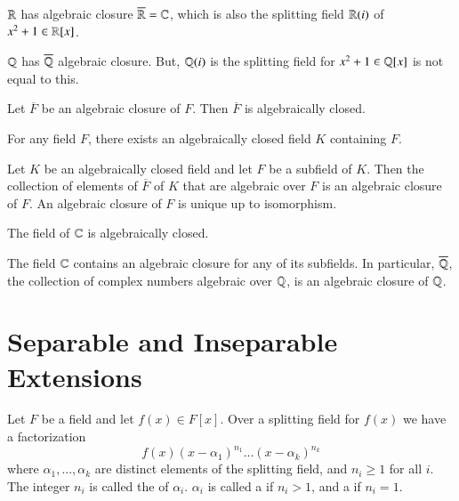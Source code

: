 \documentclass[12pt, a4paper, oneside, openright, titlepage]{book}
\begin{document}
\begin{eg}
    $\mathbb R$ has algebraic closure $\overline{\mathbb R} = \mathbb C$, which is also the splitting field $\mathbb R(i)$ of $x^2+1 \in \mathbb R[x]$.
\end{eg}

\begin{eg}
    $\mathbb Q$ has $\overline{\mathbb Q}$ algebraic closure. But, $\mathbb Q(i)$ is the splitting field for $x^2+1 \in \mathbb Q[x]$ is not equal to this.
\end{eg}

\begin{prop}
    Let $\overline{F}$ be an algebraic closure of $F$. Then $\overline{F}$ is algebraically closed.
\end{prop}

\begin{prop}
    For any field $F$, there exists an algebraically closed field $K$ containing $F$.
\end{prop}

\begin{prop}
    Let $K$ be an algebraically closed field and let $F$ be a subfield of $K$. Then the collection of elements of $\overline{F}$ of $K$ that are algebraic over $F$ is an algebraic closure of $F$. An algebraic closure of $F$ is unique up to isomorphism.
\end{prop}


\begin{thm}
    The field of $\mathbb C$ is algebraically closed.
\end{thm}

\begin{cor}
    The field $\mathbb C$ contains an algebraic closure for any of its subfields. In particular, $\overline{\mathbb Q}$, the collection of complex numbers algebraic over $\mathbb Q$, is an algebraic closure of $\mathbb Q$.
\end{cor}



\section{\textsection Separable and Inseparable Extensions}

Let $F$ be a field and let $f(x) \in F[x]$. Over a splitting field for $f(x)$ we have a factorization \begin{equation*}
    f(x) (x-\alpha_1)^{n_1}...(x-\alpha_k)^{n_k}
\end{equation*}
where $\alpha_1,...,\alpha_k$ are distinct elements of the splitting field, and $n_i \geq 1$ for all $i$. The integer $n_i$ is called the  of $\alpha_i$. $\alpha_i$ is called a  if $n_i >1$, and a  if $n_i =1$.
\end{document}
